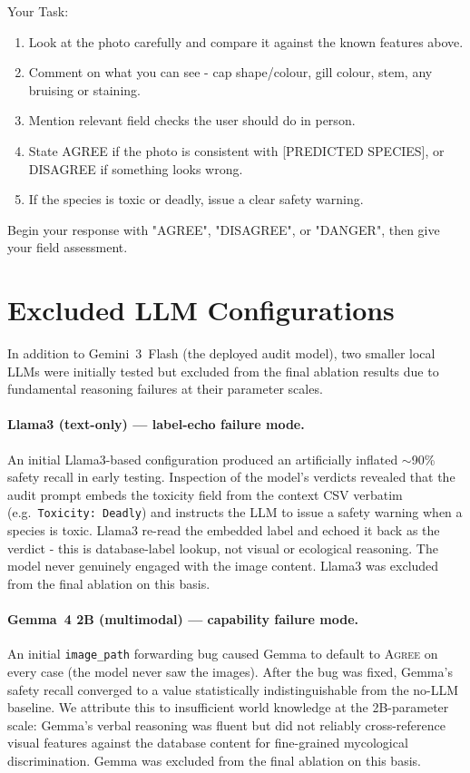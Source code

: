 \documentclass[journal,transmag]{IEEEtran}
\begin{document}
Your Task:
\begin{enumerate}
    \item Look at the photo carefully and compare it against the known features above.
    \item Comment on what you can see - cap shape/colour, gill colour, stem, any bruising or staining.
    \item Mention relevant field checks the user should do in person.
    \item State AGREE if the photo is consistent with [PREDICTED SPECIES], or DISAGREE if something looks wrong.
    \item If the species is toxic or deadly, issue a clear safety warning.
\end{enumerate}

Begin your response with "AGREE", "DISAGREE", or "DANGER", then give your field assessment.


\section{\textbf{Excluded LLM Configurations}}\label{app:ablation}
In addition to Gemini~3~Flash (the deployed audit model), two smaller
local LLMs were initially tested but excluded from the final ablation
results due to fundamental reasoning failures at their parameter scales.

\paragraph{Llama3 (text-only) — label-echo failure mode.} An initial
Llama3-based configuration produced an artificially inflated
$\sim$90\% safety recall in early testing. Inspection of the model's
verdicts revealed that the audit prompt embeds the toxicity field from
the context CSV verbatim (e.g.~\texttt{Toxicity:~Deadly}) and instructs
the LLM to issue a safety warning when a species is toxic. Llama3
re-read the embedded label and echoed it back as the verdict - this
is database-label lookup, not visual or ecological reasoning. The
model never genuinely engaged with the image content. Llama3 was
excluded from the final ablation on this basis.

\paragraph{Gemma~4 2B (multimodal) — capability failure mode.} An
initial \texttt{image\_path} forwarding bug caused Gemma to default to
\textsc{Agree} on every case (the model never saw the images). After
the bug was fixed, Gemma's safety recall converged to a value
statistically indistinguishable from the no-LLM baseline. We attribute
this to insufficient world knowledge at the 2B-parameter scale: Gemma's
verbal reasoning was fluent but did not reliably cross-reference visual
features against the database content for fine-grained mycological
discrimination. Gemma was excluded from the final ablation on this
basis.
\end{document}
